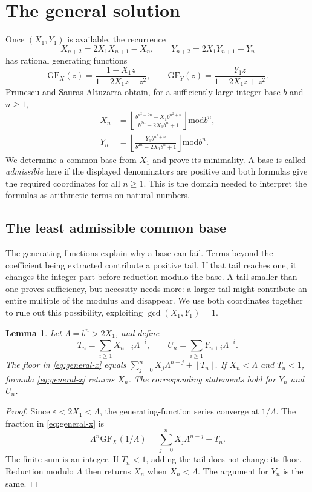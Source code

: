 \documentclass[11pt]{article}
\newtheorem{lemma}[theorem]{Lemma}
\theoremstyle{remark}
\newcommand{\eps}{\varepsilon}
\newcommand{\md}{\mathbin{\mathrm{mod}}}
\newcommand{\fl}[1]{\left\lfloor #1\right\rfloor}
\begin{document}
\section{The general solution}\label{sec:general}

Once $(X_1,Y_1)$ is available, the recurrence
\[
  X_{n+2}=2X_1X_{n+1}-X_n,\qquad
  Y_{n+2}=2X_1Y_{n+1}-Y_n
\]
has rational generating functions
\[
  \mathrm{GF}_X(z)=\frac{1-X_1z}{1-2X_1z+z^2},\qquad
  \mathrm{GF}_Y(z)=\frac{Y_1z}{1-2X_1z+z^2}.
\]
Prunescu and Sauras-Altuzarra \cite[Cor.~37]{PSA25} obtain, for a
sufficiently large integer base $b$ and $n\ge1$,
\begin{align}
  X_n&=\fl{\frac{b^{n^2+2n}-X_1b^{n^2+n}}
                  {b^{2n}-2X_1b^n+1}}\md b^n,\label{eq:general-x}\\
  Y_n&=\fl{\frac{Y_1b^{n^2+n}}
                  {b^{2n}-2X_1b^n+1}}\md b^n.\label{eq:general-y}
\end{align}
We determine a common base from $X_1$ and prove its minimality.
A base is called \emph{admissible} here if the displayed denominators
are positive and both formulas give the required coordinates for all
$n\ge1$. This is the domain needed to interpret the formulas as
arithmetic terms on natural numbers.

\subsection{The least admissible common base}

The generating functions explain why a base can fail. Terms beyond the
coefficient being extracted contribute a positive tail. If that tail
reaches one, it changes the integer part before reduction modulo the
base. A tail smaller than one proves sufficiency, but necessity needs
more: a larger tail might contribute an entire multiple of the modulus
and disappear. We use both coordinates together to rule out this
possibility, exploiting $\gcd(X_1,Y_1)=1$.

\begin{lemma}\label{lem:tail}
Let $\Lambda=b^n>2X_1$, and define
\[
  T_n=\sum_{i\ge1}X_{n+i}\Lambda^{-i},\qquad
  U_n=\sum_{i\ge1}Y_{n+i}\Lambda^{-i}.
\]
The floor in \eqref{eq:general-x} equals
$\sum_{j=0}^n X_j\Lambda^{n-j}+\fl{T_n}$.
If $X_n<\Lambda$ and $T_n<1$, formula \eqref{eq:general-x}
returns $X_n$.
The corresponding statements hold for $Y_n$ and $U_n$.
\end{lemma}

\begin{proof}
Since $\eps<2X_1<\Lambda$, the generating-function series converge
at $1/\Lambda$. The fraction in \eqref{eq:general-x} is
\[
  \Lambda^n\mathrm{GF}_X(1/\Lambda)
   =\sum_{j=0}^nX_j\Lambda^{n-j}+T_n.
\]
The finite sum is an integer. If $T_n<1$, adding the tail does not
change its floor. Reduction modulo $\Lambda$ then returns $X_n$
when $X_n<\Lambda$.
The argument for $Y_n$ is the same.
\end{proof}
\end{document}
